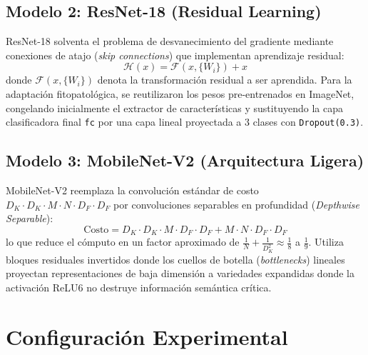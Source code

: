 \documentclass[10pt,a4paper,twoside]{article}
\begin{document}
\subsection{Modelo 2: ResNet-18 (Residual Learning)}
ResNet-18 solventa el problema de desvanecimiento del gradiente mediante conexiones de atajo (\textit{skip connections}) que implementan aprendizaje residual:
\begin{equation}
\mathcal{H}(x) = \mathcal{F}(x, \{W_i\}) + x
\end{equation}
donde $\mathcal{F}(x, \{W_i\})$ denota la transformación residual a ser aprendida. Para la adaptación fitopatológica, se reutilizaron los pesos pre-entrenados en ImageNet, congelando inicialmente el extractor de características y sustituyendo la capa clasificadora final \texttt{fc} por una capa lineal proyectada a 3 clases con \texttt{Dropout(0.3)}.

\subsection{Modelo 3: MobileNet-V2 (Arquitectura Ligera)}
MobileNet-V2 reemplaza la convolución estándar de costo $D_K \cdot D_K \cdot M \cdot N \cdot D_F \cdot D_F$ por convoluciones separables en profundidad (\textit{Depthwise Separable}):
\begin{equation}
\text{Costo} = D_K \cdot D_K \cdot M \cdot D_F \cdot D_F + M \cdot N \cdot D_F \cdot D_F
\end{equation}
lo que reduce el cómputo en un factor aproximado de $\frac{1}{N} + \frac{1}{D_K^2} \approx \frac{1}{8}$ a $\frac{1}{9}$. Utiliza bloques residuales invertidos donde los cuellos de botella (\textit{bottlenecks}) lineales proyectan representaciones de baja dimensión a variedades expandidas donde la activación ReLU6 no destruye información semántica crítica.

\section{Configuración Experimental}
\end{document}
